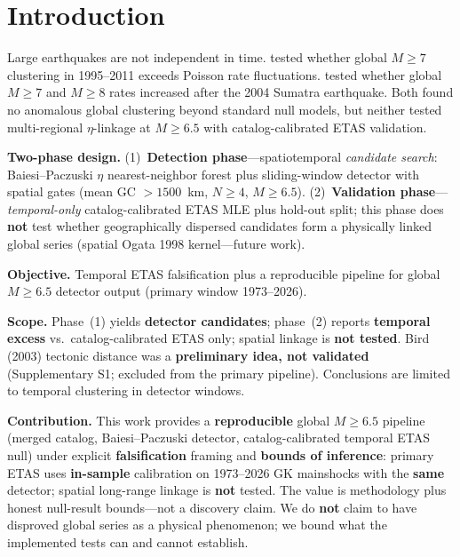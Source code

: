 \documentclass[draft]{agujournal2019}
\begin{document}
\section{Introduction}
\label{sec:intro}

Large earthquakes are not independent in time.
\citet{Michael2011} tested whether global $M \ge 7$ clustering in 1995--2011
exceeds Poisson rate fluctuations.
\citet{ShearerStark2012} tested whether global $M \ge 7$ and $M \ge 8$ rates
increased after the 2004 Sumatra earthquake.
Both found no anomalous global clustering beyond standard null models, but
neither tested multi-regional $\eta$-linkage at $M \ge 6.5$ with
catalog-calibrated ETAS validation.

\textbf{Two-phase design.} (1)~\textbf{Detection phase}---spatiotemporal
\emph{candidate search}: Baiesi--Paczuski $\eta$ nearest-neighbor forest plus
sliding-window detector with spatial gates (mean GC $> 1500$~km, $N \ge 4$,
$M \ge 6.5$).
(2)~\textbf{Validation phase}---\emph{temporal-only} catalog-calibrated ETAS MLE
plus hold-out split; this phase does \textbf{not} test whether geographically
dispersed candidates form a physically linked global series (spatial Ogata 1998
kernel---future work).

\textbf{Objective.} Temporal ETAS falsification plus a reproducible pipeline
for global $M \ge 6.5$ detector output (primary window 1973--2026).

\textbf{Scope.} Phase~(1) yields \textbf{detector candidates}; phase~(2) reports
\textbf{temporal excess} vs.\ catalog-calibrated ETAS only; spatial linkage is
\textbf{not tested}.
Bird (2003) tectonic distance was a \textbf{preliminary idea, not validated}
(Supplementary S1; excluded from the primary pipeline).
Conclusions are limited to temporal clustering in detector windows.

\textbf{Contribution.} This work provides a \textbf{reproducible} global
$M \ge 6.5$ pipeline (merged catalog, Baiesi--Paczuski detector,
catalog-calibrated temporal ETAS null) under explicit \textbf{falsification}
framing and \textbf{bounds of inference}: primary ETAS uses \textbf{in-sample}
calibration on 1973--2026 GK mainshocks with the \textbf{same} detector;
spatial long-range linkage is \textbf{not} tested.
The value is methodology plus honest null-result bounds---not a discovery claim.
We do \textbf{not} claim to have disproved global series as a physical phenomenon;
we bound what the implemented tests can and cannot establish.
\end{document}
